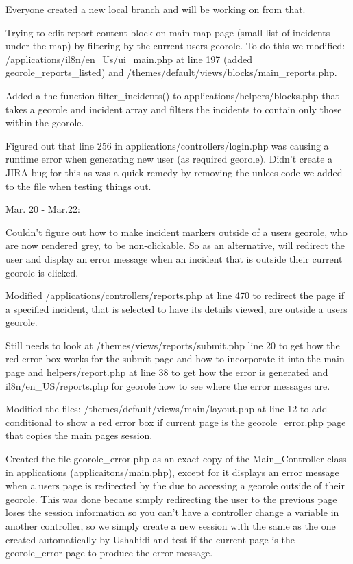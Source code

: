 \documentclass{article}
\begin{document}
    Everyone created a new local branch and will be working on from that.
    
    Trying to edit report content-block on main map page (small list of incidents under the map) by filtering by the current users georole.  To do this we modified: /applications/il8n/en_Us/ui_main.php at line 197 (added georole_reports_listed) and /themes/default/views/blocks/main_reports.php.
          
    Added a the function filter_incidents() to applications/helpers/blocks.php that takes a georole and incident array and filters the incidents to contain only those within the georole.
 
    Figured out that line 256 in applications/controllers/login.php was causing a runtime error when generating new user (as required georole).  Didn't create a JIRA bug for this as was a quick remedy by removing the unlees code we added to the file when testing things out.
                      
Mar. 20 - Mar.22:

    Couldn't figure out how to make incident markers outside of a users georole, who are now rendered grey, to be non-clickable. So as an alternative, will redirect the user and display an error message when an incident that is outside their current georole is clicked.
    
    Modified /applications/controllers/reports.php at line 470 to redirect the page if a specified incident, that is selected to have its details viewed, are outside a users georole.
    
    Still needs to look at /themes/views/reports/submit.php line 20 to get how the red error box works for the submit page and how to incorporate it into the main page and helpers/report.php at line 38 to get how the error is generated and il8n/en_US/reports.php  for georole how to see where the error messages are.
        
    Modified the files: /themes/default/views/main/layout.php at line 12 to add conditional to show a red error box if current page is the georole_error.php page that copies the main pages session.
            
    Created the file georole_error.php as an exact copy of the Main_Controller class in applications (applicaitons/main.php), except for it displays an error message when a users page is redirected by the due to accessing a georole outside of their georole. This was done becaue simply redirecting the user to the previous page loses the session information so you can't have a controller change a variable in another controller, so we simply create a new session with the same as the one created automatically by Ushahidi and test if the current page is the georole_error page to produce the error message.
\end{document}
